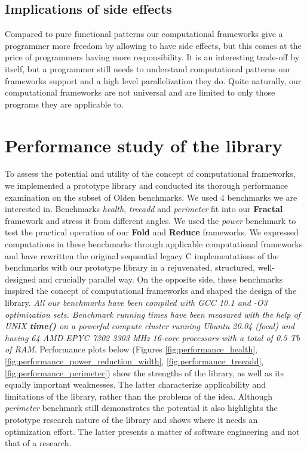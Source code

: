 \subsection{Implications of side effects}
\label{frameworks_side_effects}
\quad Compared to pure functional patterns our computational frameworks give a programmer more freedom by allowing to have side effects, but this comes at the price of programmers having more responsibility. It is an interesting trade-off by itself, but a programmer still needs to understand computational patterns our frameworks support and a high level parallelization they do. Quite naturally, our computational frameworks are not universal and are limited to only those programs they are applicable to.
\section{Performance study of the library}
\label{frameworks_performance}
\quad To assess the potential and utility of the concept of computational frameworks, we implemented a prototype library and conducted its thorough performance examination on the subset of Olden benchmarks. We used 4 benchmarks we are interested in. Benchmarks \textit{health}, \textit{treeadd} and \textit{perimeter} fit into our \textbf{Fractal} framework and stress it from different angles. We used the \textit{power} benchmark to test the practical operation of our \textbf{Fold} and \textbf{Reduce} frameworks. We expressed computations in these benchmarks through applicable computational frameworks and have rewritten the original sequential legacy C implementations of the benchmarks with our prototype library in a rejuvenated, structured, well-designed and crucially parallel way. On the opposite side, these benchmarks inspired the concept of computational frameworks and shaped the design of the library. \textit{All our benchmarks have been compiled with GCC 10.1 and -O3 optimization sets. Benchmark running times have been measured with the help of UNIX \textbf{time()} on a powerful compute cluster running Ubuntu 20.04 (focal) and having 64 AMD EPYC 7302 3303 MHz 16-core processors with a total of 0.5 Tb of RAM}.\newline\null
\quad Performance plots below (Figures \ref{fig:performance_health}, \ref{fig:performance_power_reduction_width}, \ref{fig:performance_treeadd}, \ref{fig:performance_perimeter}) show the strengths of the library, as well as its equally important weaknesses. The latter characterize applicability and limitations of the library, rather than the problems of the idea. Although \textit{perimeter} benchmark still demonstrates the potential it also highlights the prototype research nature of the library and shows where it needs an optimization effort. The latter presents a matter of software engineering and not that of a research.\newline\null
